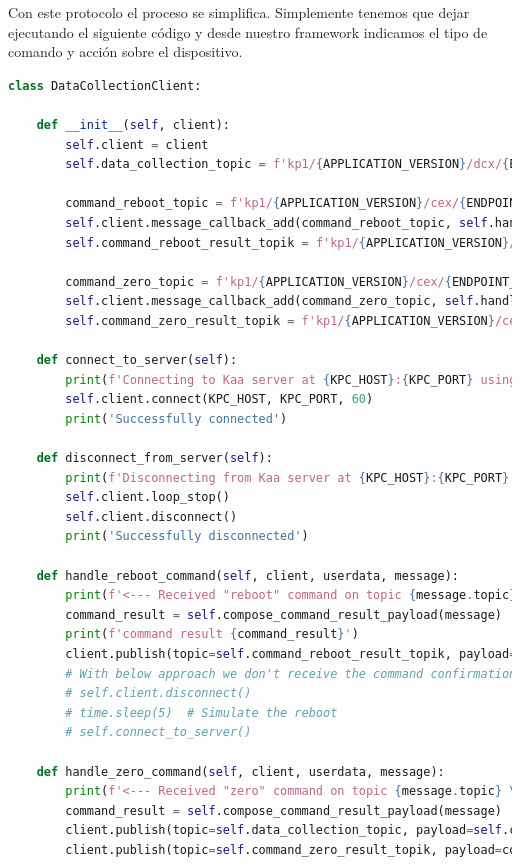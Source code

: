 {Con este protocolo el proceso se simplifica. Simplemente tenemos que dejar ejecutando el siguiente código y desde nuestro framework indicamos el tipo de comando y acción sobre el dispositivo.

\begin{lstlisting}[language=Python]
class DataCollectionClient:

    def __init__(self, client):
        self.client = client
        self.data_collection_topic = f'kp1/{APPLICATION_VERSION}/dcx/{ENDPOINT_TOKEN}/json/32'

        command_reboot_topic = f'kp1/{APPLICATION_VERSION}/cex/{ENDPOINT_TOKEN}/command/reboot/status'
        self.client.message_callback_add(command_reboot_topic, self.handle_reboot_command)
        self.command_reboot_result_topik = f'kp1/{APPLICATION_VERSION}/cex/{ENDPOINT_TOKEN}/result/reboot'

        command_zero_topic = f'kp1/{APPLICATION_VERSION}/cex/{ENDPOINT_TOKEN}/command/zero/status'
        self.client.message_callback_add(command_zero_topic, self.handle_zero_command)
        self.command_zero_result_topik = f'kp1/{APPLICATION_VERSION}/cex/{ENDPOINT_TOKEN}/result/zero'

    def connect_to_server(self):
        print(f'Connecting to Kaa server at {KPC_HOST}:{KPC_PORT} using application version {APPLICATION_VERSION} and endpoint token {ENDPOINT_TOKEN}')
        self.client.connect(KPC_HOST, KPC_PORT, 60)
        print('Successfully connected')

    def disconnect_from_server(self):
        print(f'Disconnecting from Kaa server at {KPC_HOST}:{KPC_PORT}...')
        self.client.loop_stop()
        self.client.disconnect()
        print('Successfully disconnected')

    def handle_reboot_command(self, client, userdata, message):
        print(f'<--- Received "reboot" command on topic {message.topic} \nRebooting...')
        command_result = self.compose_command_result_payload(message)
        print(f'command result {command_result}')
        client.publish(topic=self.command_reboot_result_topik, payload=command_result)
        # With below approach we don't receive the command confirmation on the server side.
        # self.client.disconnect()
        # time.sleep(5)  # Simulate the reboot
        # self.connect_to_server()

    def handle_zero_command(self, client, userdata, message):
        print(f'<--- Received "zero" command on topic {message.topic} \nSending zero values...')
        command_result = self.compose_command_result_payload(message)
        client.publish(topic=self.data_collection_topic, payload=self.compose_data_sample(0, 0, 0))
        client.publish(topic=self.command_zero_result_topik, payload=command_result)


\end{lstlisting}}
